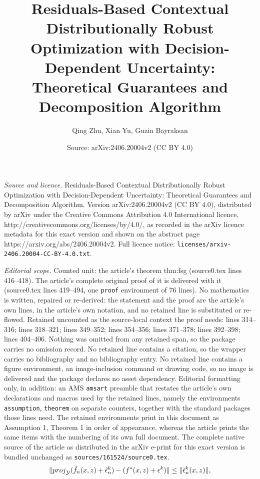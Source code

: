 \documentclass[10pt,a4paper]{amsart}
\title{Residuals-Based Contextual Distributionally Robust Optimization with Decision-Dependent Uncertainty: Theoretical Guarantees and Decomposition Algorithm}
\author{Qing Zhu, Xian Yu, Guzin Bayraksan}
\date{Source: arXiv:2406.20004v2 (CC BY 4.0)}
\begin{document}
\maketitle

\noindent\emph{Source and licence.} Residuals-Based Contextual Distributionally Robust Optimization with Decision-Dependent Uncertainty: Theoretical Guarantees and Decomposition Algorithm. Version arXiv:2406.20004v2 (CC BY 4.0), distributed by arXiv under the Creative Commons Attribution 4.0 International licence, http://creativecommons.org/licenses/by/4.0/, as recorded in the arXiv licence metadata for this exact version and shown on the abstract page https://arxiv.org/abs/2406.20004v2. Full licence notice: \texttt{licenses/arxiv-2406.20004-CC-BY-4.0.txt}.\par\smallskip

\noindent\textit{Editorial scope.} Counted unit: the article's theorem thm:fsg (source0.tex lines 416--418). The article's complete original proof of it is delivered with it (source0.tex lines 419--494, one \texttt{proof} environment of 76 lines). No mathematics is written, repaired or re-derived: the statement and the proof are the article's own lines, in the article's own notation, and no retained line is substituted or re-flowed.  Retained uncounted as the source-local context the proof needs: lines 314--316; lines 318--321; lines 349--352; lines 354--356; lines 371--378; lines 392--398; lines 404--406.  Nothing was omitted from any retained span, so the package carries no omission record.  No retained line contains a citation, so the wrapper carries no bibliography and no bibliography entry.  No retained line contains a figure environment, an image-inclusion command or drawing code, so no image is delivered and the package declares no asset dependency.  Editorial formatting only, in addition: an AMS \texttt{amsart} preamble that restates the article's own declarations and macros used by the retained lines, namely the environments \texttt{assumption}, \texttt{theorem} on separate counters, together with the standard packages those lines need.  The retained environments print in this document as Assumption 1, Theorem 1 in order of appearance, whereas the article prints the same items with the numbering of its own full document.  The complete native source of the article as distributed in the arXiv e-print for this exact version is bundled unchanged as \texttt{sources/161524/source0.tex}.
\begin{align}\label{eq:projection lip}
    \|{\rm{proj}}_\mathcal{Y} (\hat{f}_n(x,z)+\hat{\epsilon}_n^k)-(f^*(x,z)+\epsilon^k)\| \leq \|\tilde{\epsilon}_n^k(x,z)\|, 
\end{align}
\end{document}
